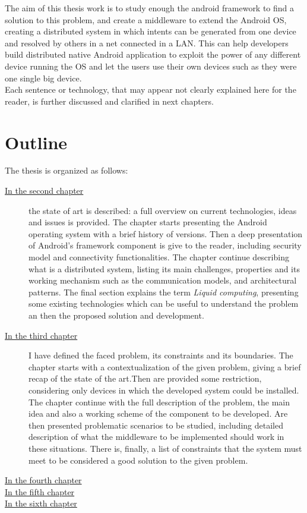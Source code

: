 The aim of this thesis work is to study enough the android framework to find a solution to this problem, and create a middleware to extend the Android OS, creating a distributed system in which intents can be generated from one device and resolved by others in a net connected in a LAN. This can help developers build distributed native Android application to exploit the power of any different device running the OS and let the users use their own devices such as they were one single big device.
\\Each sentence or technology, that may appear not clearly explained here for the reader, is further discussed and clarified in next chapters.

%
%
\section{Outline}
%
\par The thesis is organized as follows:
%
%
\begin{description}
%
\item[{\hyperref[cap:statoarte]{In the second chapter}}] the state of art is described: a full overview on current technologies, ideas and issues is provided. The chapter starts presenting the Android operating system with a brief history of versions. Then a deep presentation of Android's framework component is give to the reader, including security model and connectivity functionalities. The chapter continue describing what is a distributed system, listing its main challenges, properties and its working mechanism such as the communication models, and architectural patterns. The final section explains the term \textit{Liquid computing}, presenting some existing technologies which can be useful to understand the problem an then the proposed solution and development.
%
\item[{\hyperref[cap:probanalysis]{In the third chapter}}] I have defined the faced problem, its constraints and its boundaries. The chapter starts with a contextualization of the given problem, giving a brief recap of the state of the art.Then are provided some restriction, considering only devices in which the developed system could be installed. The chapter continue with the full description of the problem, the main idea and also a working scheme of the component to be developed. Are then presented problematic scenarios to be studied, including detailed description of what the middleware to be implemented should work in these situations. There is, finally, a list of constraints that the system must meet to be considered a good solution to the given problem.

\item[{\hyperref[cap:proposedsolution]{In the fourth chapter}}] 

\item[{\hyperref[cap:proofofconcept]{In the fifth chapter}}]

\item[{\hyperref[cap:conclusions]{In the sixth chapter}}]
%
\end{description}
%
